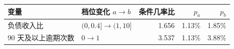 \begin{tabular}{llrrr}
\toprule
变量 & 档位变化 $a\to b$ & 条件几率比 & $p_a$ & $p_b$ \\
\midrule
负债收入比 & $(0,0.4]\to(1,10]$ & 1.656 & 1.13\% & 1.85\% \\
90 天及以上逾期次数 & $0\to1$ & 3.537 & 1.13\% & 3.88\% \\
\bottomrule
\end{tabular}
